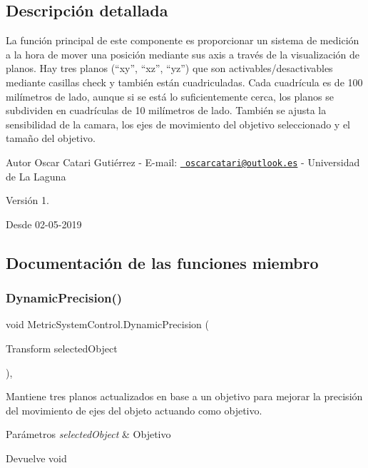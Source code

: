 \subsection{Descripción detallada}
La función principal de este componente es proporcionar un sistema de medición a la hora de mover una posición mediante sus axis a través de la visualización de planos. Hay tres planos (“xy”, “xz”, “yz”) que son activables/desactivables mediante casillas check y también están cuadriculadas. Cada cuadrícula es de 100 milímetros de lado, aunque si se está lo suficientemente cerca, los planos se subdividen en cuadrículas de 10 milímetros de lado. También se ajusta la sensibilidad de la camara, los ejes de movimiento del objetivo seleccionado y el tamaño del objetivo. \begin{DoxyAuthor}{Autor}
Oscar Catari Gutiérrez -\/ E-\/mail\+: \href{mailto:oscarcatari@outlook.es}{\texttt{ oscarcatari@outlook.\+es}} -\/ Universidad de La Laguna 
\end{DoxyAuthor}
\begin{DoxyVersion}{Versión}
1. 
\end{DoxyVersion}
\begin{DoxySince}{Desde}
02-\/05-\/2019 
\end{DoxySince}


\subsection{Documentación de las funciones miembro}
\mbox{\label{class_metric_system_control_a853f57f47211b8c3a1f48c53ba552a0e}} 
\subsubsection{\texorpdfstring{DynamicPrecision()}{DynamicPrecision()}}
{\footnotesize\ttfamily void Metric\+System\+Control.\+Dynamic\+Precision (\begin{DoxyParamCaption}\item[{Transform}]{selected\+Object }\end{DoxyParamCaption})\hspace{0.3cm}{\ttfamily [inline]}, {\ttfamily [private]}}

Mantiene tres planos actualizados en base a un objetivo para mejorar la precisión del movimiento de ejes del objeto actuando como objetivo. 
\begin{DoxyParams}{Parámetros}
{\em selected\+Object} & Objetivo \\
\hline
\end{DoxyParams}
\begin{DoxyReturn}{Devuelve}
void 
\end{DoxyReturn}
\mbox{\label{class_metric_system_control_a9ec2278d531e8f0705a241c97aae7909}} 
